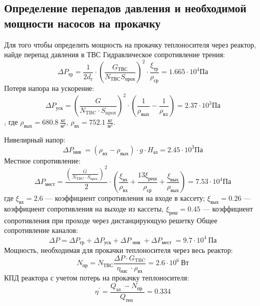 \subsection{Определение перепадов давления и необходимой мощности насосов на прокачку}
Для того чтобы определить мощность на прокачку теплоносителя через реактор, найде перепад давления в ТВС
Гидравлическое сопротивление трения:
$$
\Delta P_{\text{тр}} = \frac 1 {2 d_{\text{г}}} \cdot \left(\frac {G_{\text{ТВС}}}{N_{\text{ТВС}}S_{\text{прох}}}  \right)^2 \cdot \frac {\xi_{\text{тр}}} {\rho_{\text{ср}}} = 1.665 \cdot 10^4 \text{Па}
$$
Потеря напора на ускорение:
$$
\Delta P_{\mathrm{уск}}=\left(\frac{G}{N_{\mathrm{TBC}} \cdot S_{\mathrm{npox}}}\right)^{2} \cdot\left(\frac{1}{\rho_{\mathrm{вых}}}-\frac{1}{\rho_{\mathrm{вx}}}\right) = 2.37 \cdot 10^3 \text{Па}
$$, где $\rho_{\text{вых}} = 680.8\  \frac {\text{кг}}{\text{м}^2} $, $\rho_{\text{вх}} =752.1\  \frac {\text{кг}}{\text{м}^2}$.

\noindent Нивелирный напор:
$$
\Delta P_{\text {нив }}=\left(\rho_{\text{вх}}-\rho_{\text{вых}}\right) \cdot g \cdot H_{\text{аз}}=2.45 \cdot 10^{3} \text{Па}
$$
Местное сопротивление:
$$
\Delta P_{\mathrm{мест}}=\frac{\left(\frac{G}{N_{\mathrm{TBC}} \cdot S_{\mathrm{прох}}}\right)^{2}}{2} \cdot\left(\frac{\xi_{\mathrm{вх}}}{\rho_{\mathrm{вх}}}+\frac{13 \xi_{\mathrm{реш}}}{\rho_{\mathrm{ср}}}+\frac{\xi_{\mathrm{вых}}}{\rho_{\mathrm{вых}}}\right)= 7.53 \cdot 10^4 \text{Па}
$$
где $\xi_{\text{вх}}= 2.6 $ — коэффициент сопротивления на входе в кассету; $\xi_{\text{вых}} = 0.26$ — коэффициент сопротивления на выходе из кассеты, $\xi_{\text{реш}} = 0.45$ — коэффициент сопротивления при проходе через дистанцирующую решетку %
Общее сопротивление каналов:
$$
\Delta P=\Delta P_{\mathrm{тр}}+\Delta P_{\mathrm{уск}}+\Delta P_{\text { нив }}+\Delta P_{\text {мест }} = 9.7 \cdot 10^4\  \text{Па} 
$$
Мощность, необходимая для прокачки теплоносителя через весь реактор:
$$
N_{\mathrm{пр}}=N_{\mathrm{ТВС}} \frac{\Delta P \cdot G_{\mathrm{TBC}}}{\eta_{\text {нас }} \cdot \rho_{\mathrm{вх}}}= 2.6 \cdot 10^6\  \text{Вт}
$$
КПД реактора с учетом потерь на прокачку теплоносителя:
$$
\eta^{\prime}=\frac{Q_{\text {эл }}-N_{\text {пр }}}{Q_{\text {теп }}} = 0.334 
$$

